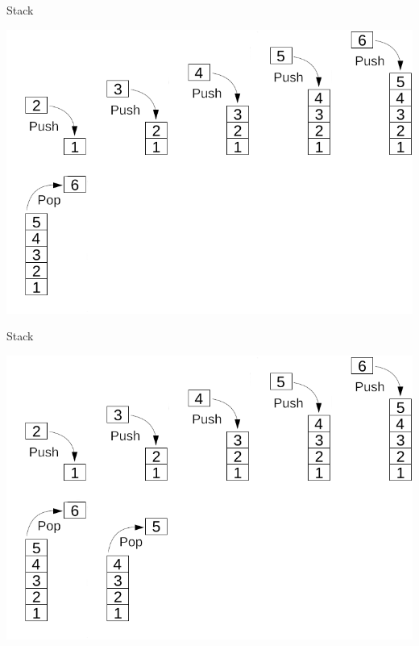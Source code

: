 \documentclass[aspectratio=169]{beamer}
\begin{document}
\begin{frame}{Stack}
    \begin{center}
        \includegraphics[scale=0.4625]{images/stack/Stack_5.png}
    \end{center}
\end{frame}

\begin{frame}{Stack}
    \begin{center}
        \includegraphics[scale=0.4625]{images/stack/Stack_6.png}
    \end{center}
\end{frame}
\end{document}
